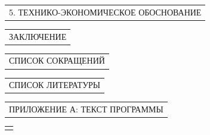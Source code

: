 \documentclass[12pt, А4, twoside]{article}
\begin{document}
\begin{FlushLeft}
    \vspace{-0.1 cm}

    \begin{tabular}{p{17.25cm}} 
        \hspace{0.3cm} \textsf{5. ТЕХНИКО-ЭКОНОМИЧЕСКОЕ ОБОСНОВАНИЕ} \vspace{1pt} \hline \\
    \end{tabular}  

    \vspace{-0.1 cm}

    \begin{tabular}{p{17.25cm}}
        \hspace{0.3cm} \textsf{ЗАКЛЮЧЕНИЕ} \vspace{1pt} \hline \\
    \end{tabular}

    \vspace{-0.1 cm}

    \begin{tabular}{p{17.25cm}}
        \hspace{0.3cm} \textsf{СПИСОК СОКРАЩЕНИЙ} \vspace{0pt} \hline \\
    \end{tabular}

    \vspace{-0.1 cm}

    \begin{tabular}{p{17.25cm}}
        \hspace{0.3cm} \textsf{СПИСОК ЛИТЕРАТУРЫ} \vspace{1pt} \hline  \\
    \end{tabular}

    \vspace{-0.1 cm}

    \begin{tabular}{p{17.25cm}}
        \hspace{0.3cm} \textsf{ПРИЛОЖЕНИЕ А: ТЕКСТ ПРОГРАММЫ} \vspace{1pt} \hline  \\
    \end{tabular}

    \begin{tabular}{p{17.25cm}}
        \vspace{0pt} \hline \\
    \end{tabular}


\end{FlushLeft}
\end{document}
